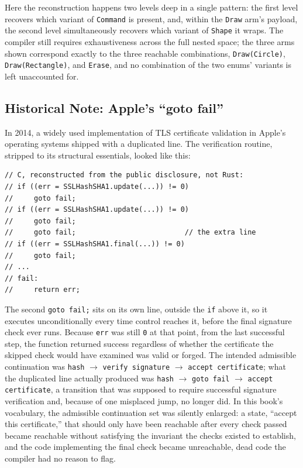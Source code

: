 \documentclass[11pt]{book}
\begin{document}
Here the reconstruction happens two levels deep in a single pattern: the first level recovers which variant of \texttt{Command} is present, and, within the \texttt{Draw} arm's payload, the second level simultaneously recovers which variant of \texttt{Shape} it wraps. The compiler still requires exhaustiveness across the full nested space; the three arms shown correspond exactly to the three reachable combinations, \texttt{Draw(Circle)}, \texttt{Draw(Rectangle)}, and \texttt{Erase}, and no combination of the two enums' variants is left unaccounted for.

\subsection*{Historical Note: Apple's ``goto fail''}

In 2014, a widely used implementation of TLS certificate validation in Apple's operating systems shipped with a duplicated line. The verification routine, stripped to its structural essentials, looked like this:

\begin{lstlisting}
// C, reconstructed from the public disclosure, not Rust:
// if ((err = SSLHashSHA1.update(...)) != 0)
//     goto fail;
// if ((err = SSLHashSHA1.update(...)) != 0)
//     goto fail;
//     goto fail;                          // the extra line
// if ((err = SSLHashSHA1.final(...)) != 0)
//     goto fail;
// ...
// fail:
//     return err;
\end{lstlisting}

The second \texttt{goto fail;} sits on its own line, outside the \texttt{if} above it, so it executes unconditionally every time control reaches it, before the final signature check ever runs. Because \texttt{err} was still \texttt{0} at that point, from the last successful step, the function returned success regardless of whether the certificate the skipped check would have examined was valid or forged. The intended admissible continuation was \texttt{hash} $\rightarrow$ \texttt{verify signature} $\rightarrow$ \texttt{accept certificate}; what the duplicated line actually produced was \texttt{hash} $\rightarrow$ \texttt{goto fail} $\rightarrow$ \texttt{accept certificate}, a transition that was supposed to require successful signature verification and, because of one misplaced jump, no longer did. In this book's vocabulary, the admissible continuation set was silently enlarged: a state, ``accept this certificate,'' that should only have been reachable after every check passed became reachable without satisfying the invariant the checks existed to establish, and the code implementing the final check became unreachable, dead code the compiler had no reason to flag.
\end{document}
